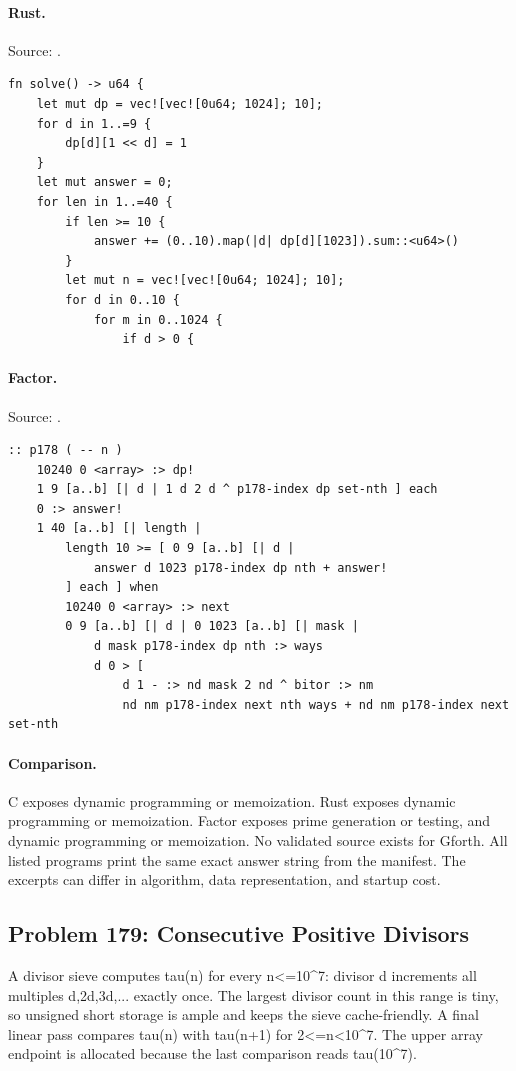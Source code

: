 \paragraph{Rust.} Source: .
\begin{lstlisting}
fn solve() -> u64 {
    let mut dp = vec![vec![0u64; 1024]; 10];
    for d in 1..=9 {
        dp[d][1 << d] = 1
    }
    let mut answer = 0;
    for len in 1..=40 {
        if len >= 10 {
            answer += (0..10).map(|d| dp[d][1023]).sum::<u64>()
        }
        let mut n = vec![vec![0u64; 1024]; 10];
        for d in 0..10 {
            for m in 0..1024 {
                if d > 0 {
\end{lstlisting}

\paragraph{Factor.} Source: .
\begin{lstlisting}
:: p178 ( -- n )
    10240 0 <array> :> dp!
    1 9 [a..b] [| d | 1 d 2 d ^ p178-index dp set-nth ] each
    0 :> answer!
    1 40 [a..b] [| length |
        length 10 >= [ 0 9 [a..b] [| d |
            answer d 1023 p178-index dp nth + answer!
        ] each ] when
        10240 0 <array> :> next
        0 9 [a..b] [| d | 0 1023 [a..b] [| mask |
            d mask p178-index dp nth :> ways
            d 0 > [
                d 1 - :> nd mask 2 nd ^ bitor :> nm
                nd nm p178-index next nth ways + nd nm p178-index next set-nth
\end{lstlisting}

\paragraph{Comparison.}
C exposes dynamic programming or memoization. Rust exposes dynamic programming or memoization. Factor exposes prime generation or testing, and dynamic programming or memoization.
No validated source exists for Gforth.
All listed programs print the same exact answer string from the manifest. The excerpts can differ in algorithm, data representation, and startup cost.

\subsection{Problem 179: Consecutive Positive Divisors}
\label{walkthrough:p179}
A divisor sieve computes tau(n) for every n<=10\textasciicircum{}7: divisor d increments all multiples d,2d,3d,... exactly once. The largest divisor count in this range is tiny, so unsigned short storage is ample and keeps the sieve cache-friendly. A final linear pass compares tau(n) with tau(n+1) for 2<=n<10\textasciicircum{}7. The upper array endpoint is allocated because the last comparison reads tau(10\textasciicircum{}7).

